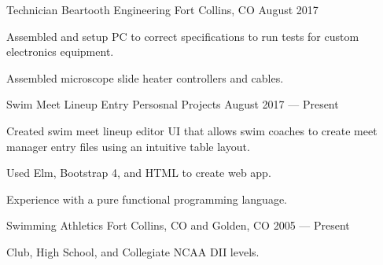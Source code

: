 \begin{cventries}
  \cventry
    {Technician} %
    {Beartooth Engineering} %
    {Fort Collins, CO} %
    {August 2017} %
    {
      \begin{cvitems} %
        \item {Assembled and setup PC to correct specifications to run tests for custom electronics equipment.}
        \item {Assembled microscope slide heater controllers and cables.}
      \end{cvitems}
    }


  \cventry
    {Swim Meet Lineup Entry}
    {Persosnal Projects} %
    {} %
    {August 2017 --- Present} %
    {
      \begin{cvitems} %
        \item {Created swim meet lineup editor UI that allows swim coaches to create meet manager entry files using an intuitive table layout.}
        \item {Used Elm, Bootstrap 4, and HTML to create web app.}
        \item {Experience with a pure functional programming language.}
        \end{cvitems}
   }

 \cventry
    {Swimming} %
    {Athletics} %
    {Fort Collins, CO and Golden, CO} %
    {2005 --- Present} %
    {
      \begin{cvitems} %
        \item {Club, High School, and Collegiate NCAA DII levels.}
      \end{cvitems}
   }

\end{cventries}
